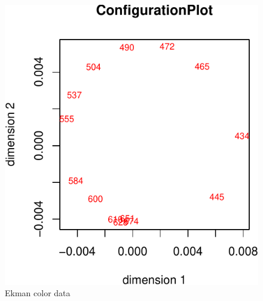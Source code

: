 \documentclass[
  12pt,
]{article}
\begin{document}
\begin{figure}

{\centering \includegraphics{smacofPC_files/figure-latex/ekmanconf-1} 

}

\caption{Ekman color data}\label{fig:ekmanconf}
\end{figure}
\end{document}
